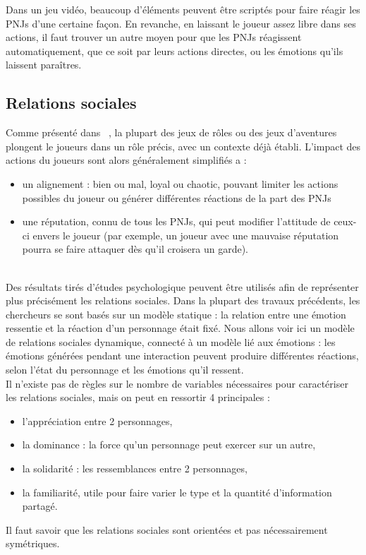 \documentclass[asi]{picINSA}
\begin{document}
Dans un jeu vidéo, beaucoup d'éléments peuvent être scriptés pour faire réagir les PNJs d'une certaine façon. En revanche, en laissant le joueur assez libre dans ses actions, il faut trouver un autre moyen pour que les PNJs réagissent automatiquement, que ce soit par leurs actions directes, ou les émotions qu'ils laissent paraîtres.\\

\subsection{Relations sociales}

Comme présenté dans ~\cite{IRIS:conf/aiide/OchsSC2008}, la plupart des jeux de rôles ou des jeux d'aventures plongent le joueurs dans un rôle précis, avec un contexte déjà établi. L'impact des actions du joueurs sont alors généralement simplifiés a :

\begin{itemize}
\item un alignement : bien ou mal, loyal ou chaotic, pouvant limiter
  les actions possibles du joueur ou générer différentes réactions de
  la part des PNJs

\item une réputation, connu de tous les PNJs, qui peut modifier
  l'attitude de ceux-ci envers le joueur (par exemple, un joueur avec
  une mauvaise réputation pourra se faire attaquer dès qu'il croisera
  un garde).
\end{itemize}

~\\
Des résultats tirés d'études psychologique peuvent être utilisés afin de représenter plus précisément les relations sociales. Dans la plupart des travaux précédents, les chercheurs se sont basés sur un modèle statique : la relation entre une émotion ressentie et la réaction d'un personnage était fixé. Nous allons voir ici un modèle de relations sociales dynamique, connecté à un modèle lié aux émotions : les émotions générées pendant une interaction peuvent produire différentes réactions, selon l'état du personnage et les émotions qu'il ressent.\\

Il n'existe pas de règles sur le nombre de variables nécessaires pour caractériser les relations sociales, mais on peut en ressortir 4 principales : 
\begin{itemize}
\item l'appréciation entre 2 personnages,
\item la dominance : la force qu'un personnage peut exercer sur un autre,
\item la solidarité : les ressemblances entre 2 personnages,
\item la familiarité, utile pour faire varier le type et la quantité d'information partagé.
\end{itemize}
Il faut savoir que les relations sociales sont orientées et pas nécessairement symétriques.\\
\end{document}
